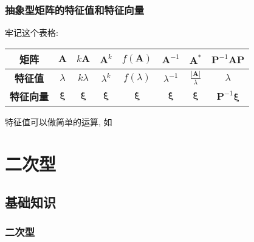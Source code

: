\subsection{抽象型矩阵的特征值和特征向量}
牢记这个表格:
\begin{table}[H]
\centering
\begin{tabular}{|c|ccccccc|}
\hline
\textbf{矩阵} & $ \bm{A} $ & $ k\bm{A} $ & $ \bm{A}^{k} $ & $ f(\bm{A}) $ & $ \bm{A}^{-1} $ & $ \bm{A}^{*} $ & $ \bm{P}^{-1}\bm{A}\bm{P} $ \\ \hline
\textbf{特征值} & $ \lambda $ & $ k\lambda $ & $ \lambda^{k} $ & $ f(\lambda) $ & $ \lambda^{-1} $ & $ \frac{\left|\bm{A}\right|}{\lambda} $ & $ \lambda $\\ \hline
\textbf{特征向量} & $ \bm{\xi} $ & $ \bm{\xi} $ & $ \bm{\xi} $ & $ \bm{\xi} $ & $ \bm{\xi} $ & $ \bm{\xi} $ & $ \bm{P}^{-1}\bm{\xi} $\\
\hline
\end{tabular}
\end{table}\par
特征值可以做简单的运算, 如
\chapter{二次型}
\section{基础知识}
\subsection{二次型}
